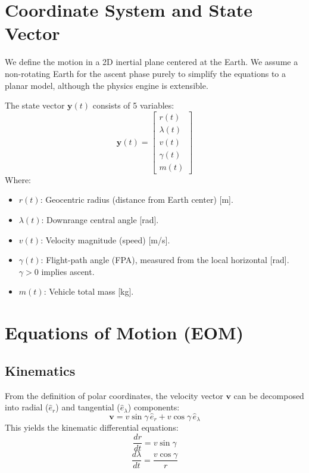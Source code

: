 \documentclass[11pt]{article}
\begin{document}
\section{Coordinate System and State Vector}

We define the motion in a 2D inertial plane centered at the Earth. We assume a non-rotating Earth for the ascent phase purely to simplify the equations to a planar model, although the physics engine is extensible.

The state vector $\bm{y}(t)$ consists of 5 variables:
\begin{equation}
    \label{eq:state_vector}
    \bm{y}(t) = \begin{bmatrix} r(t) \\ \lambda(t) \\ v(t) \\ \gamma(t) \\ m(t) \end{bmatrix}
\end{equation}
Where:
\begin{itemize}
    \item $r(t)$: Geocentric radius (distance from Earth center) [m].
    \item $\lambda(t)$: Downrange central angle [rad].
    \item $v(t)$: Velocity magnitude (speed) [m/s].
    \item $\gamma(t)$: Flight-path angle (FPA), measured from the local horizontal [rad]. $\gamma > 0$ implies ascent.
    \item $m(t)$: Vehicle total mass [kg].
\end{itemize}

\section{Equations of Motion (EOM)}
\label{sec:eom}

\subsection{Kinematics}
From the definition of polar coordinates, the velocity vector $\bm{v}$ can be decomposed into radial ($\hat{e}_r$) and tangential ($\hat{e}_\lambda$) components:
\begin{equation}
    \bm{v} = v \sin\gamma \, \hat{e}_r + v \cos\gamma \, \hat{e}_\lambda
\end{equation}
This yields the kinematic differential equations:
\begin{equation}
    \label{eq:dr}
    \frac{dr}{dt} = v \sin\gamma
\end{equation}
\begin{equation}
    \label{eq:dlam}
    \frac{d\lambda}{dt} = \frac{v \cos\gamma}{r}
\end{equation}
\end{document}
